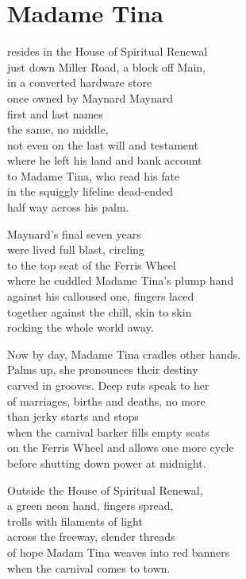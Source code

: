 \documentclass[twoside,10pt]{book}
\begin{document}
\clearpage
\section{Madame Tina}

resides in the House of Spiritual Renewal\\
just down Miller Road, a block off Main,\\
in a converted hardware store\\
once owned by Maynard Maynard\\
first and last names\\
the same, no middle,\\
not even on the last will and testament\\
where he left his land and bank account\\
to Madame Tina, who read his fate\\
in the squiggly lifeline dead-ended\\
half way across his palm.

Maynard's final seven years\\
were lived full blast, circling\\
to the top seat of the Ferris Wheel\\
where he cuddled Madame Tina's plump hand\\
against his calloused one, fingers laced\\
together against the chill, skin to skin\\
rocking the whole world away.

Now by day, Madame Tina cradles other hands.\\
Palms up, she pronounces their destiny\\
carved in grooves. Deep ruts speak to her\\
of marriages, births and deaths, no more\\
than jerky starts and stops\\
when the carnival barker fills empty seats\\
on the Ferris Wheel and allows one more cycle\\
before shutting down power at midnight.

Outside the House of Spiritual Renewal,\\
a green neon hand, fingers spread,\\
trolls with filaments of light\\
across the freeway, slender threads\\
of hope Madam Tina weaves into red banners\\
when the carnival comes to town.
\end{document}
